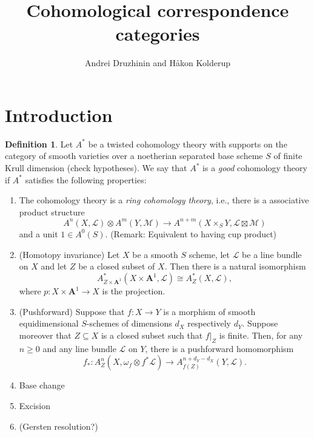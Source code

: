 \documentclass[a4paper, oneside, english,reqno]{amsart}
\theoremstyle{plain}
\theoremstyle{definition}
\newtheorem{definition}[theorem]{Definition}
\theoremstyle{remark}
\newcommand{\A}{\mathbf{A}}
\newcommand{\scrL}{\mathscr{L}}
\newcommand{\scrM}{\mathscr{M}}
\begin{document}
\title{Cohomological correspondence categories}
\author{Andrei Druzhinin and Håkon Kolderup}
\maketitle

\section{Introduction}

\begin{definition}\label{def:coh}
Let $A^*$ be a twisted cohomology theory with supports on the category of smooth varieties over a noetherian separated base scheme $S$ of finite Krull dimension (check hypotheses). We say that $A^*$ is a \emph{good} cohomology theory if $A^*$ satisfies the following properties:
\begin{enumerate}
\item The cohomology theory is a \emph{ring cohomology theory}, i.e., there is a associative product structure
\[
A^n(X,\scrL)\otimes A^m(Y,\scrM)\to A^{n+m}(X\times_S Y,\scrL\boxtimes \scrM)
\]
and a unit $1\in A^0(S)$. (Remark: Equivalent to having cup product)
\item (Homotopy invariance) Let $X$ be a smooth $S$ scheme, let $\scrL$ be a line bundle on $X$ and let $Z$ be a closed subset of $X$. Then there is a natural isomorphism
\[
A^*_{Z\times\A^1}(X\times\A^1,\scrL)\cong A^*_Z(X,\scrL),
\]
where $p\colon X\times\A^1\to X$ is the projection.
\item (Pushforward) Suppose that $f\colon X\to Y$ is a morphism of smooth equidimensional $S$-schemes of dimensions $d_X$ respectively $d_Y$. Suppose moreover that $Z\subseteq X$ is a closed subset such that $f|_Z$ is finite. Then, for any $n\ge0$ and any line bundle $\scrL$ on $Y$, there is a pushforward homomorphism
\[
f_*\colon A^n_Z(X,\omega_f\otimes f^*\scrL)\to A^{n+d_Y-d_X}_{f(Z)}(Y,\scrL).
\]
\item Base change
\item Excision
\item (Gersten resolution?)

\end{enumerate}
\end{definition}
\end{document}
